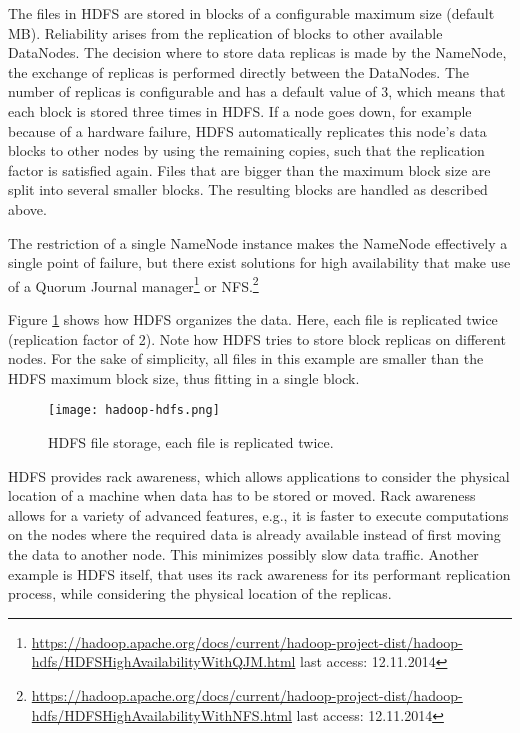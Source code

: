 The files in HDFS are stored in blocks of a configurable maximum size (default \unit[128]{MB}). Reliability arises from the replication of blocks to other available DataNodes. The decision where to store data replicas is made by the NameNode, the exchange of replicas is performed directly between the DataNodes. The number of replicas is configurable and has a default value of 3, which means that each block is stored three times in HDFS. If a node goes down, for example because of a hardware failure, HDFS automatically replicates this node's data blocks to other nodes by using the remaining copies, such that the replication factor is satisfied again. Files that are bigger than the maximum block size are split into several smaller blocks. The resulting blocks are handled as described above.

The restriction of a single NameNode instance makes the NameNode effectively a single point of failure, but there exist solutions for high availability that make use of a Quorum Journal manager\footnote{\url{https://hadoop.apache.org/docs/current/hadoop-project-dist/hadoop-hdfs/HDFSHighAvailabilityWithQJM.html} last access: 12.11.2014} or NFS.\footnote{\url{https://hadoop.apache.org/docs/current/hadoop-project-dist/hadoop-hdfs/HDFSHighAvailabilityWithNFS.html} last access: 12.11.2014}

Figure \ref{fig:hadoop-hdfs} shows how HDFS organizes the data. Here, each file is replicated twice (replication factor of 2). Note how HDFS tries to store block replicas on different nodes. For the sake of simplicity, all files in this example are smaller than the HDFS maximum block size, thus fitting in a single block.

\begin{figure}
  \centering
  \texttt{[image: hadoop-hdfs.png]}
  \caption[HDFS file storage]{HDFS file storage, each file is replicated twice.}
  \label{fig:hadoop-hdfs}
\end{figure}

HDFS provides rack awareness, which allows applications to consider the physical location of a machine when data has to be stored or moved. Rack awareness allows for a variety of advanced features, e.g., it is faster to execute computations on the nodes where the required data is already available instead of first moving the data to another node. This minimizes possibly slow data traffic. Another example is HDFS itself, that uses its rack awareness for its performant replication process, while considering the physical location of the replicas.

